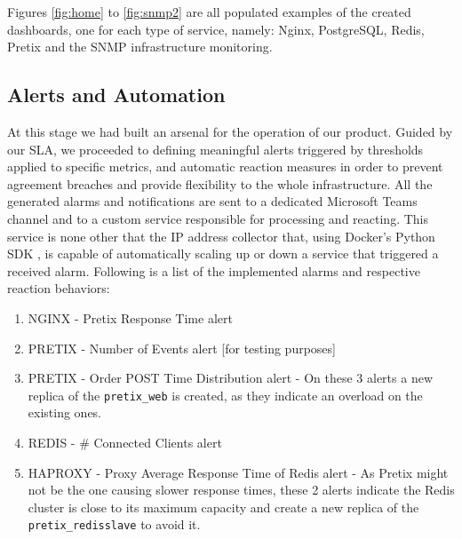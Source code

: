 \documentclass[12pt]{article}
\begin{document}
Figures \ref{fig:home} to \ref{fig:snmp2} are all populated examples of the created dashboards, one for each type of service, namely: 
Nginx, PostgreSQL, Redis, Pretix and the SNMP infrastructure monitoring.

\subsection{Alerts and Automation} \label{management.automation} %


At this stage we had built an arsenal for the operation of our product.
Guided by our SLA, we proceeded to defining meaningful alerts triggered by thresholds applied to specific metrics, and automatic reaction measures in order to
prevent agreement breaches and provide flexibility to the whole infrastructure.
All the generated alarms and notifications are sent to a dedicated Microsoft Teams channel and to a custom service responsible for processing and reacting.
This service is none other that the IP address collector that, using Docker's Python SDK \cite{dockerpythonsdk}, is capable of automatically scaling up or down
a service that triggered a received alarm.
Following is a list of the implemented alarms and respective reaction behaviors:

\vspace{-10pt}
\begin{enumerate}[noitemsep]
  \item NGINX   - Pretix Response Time alert
  \item PRETIX  - Number of Events alert [for testing purposes]
  \item PRETIX  - Order POST Time Distribution alert          - On these 3 alerts a new replica of the \texttt{pretix\_web} is created, as they indicate an overload on the existing ones.
  \item REDIS   - \# Connected Clients alert
  \item HAPROXY - Proxy Average Response Time of Redis alert  - As Pretix might not be the one causing slower response times, these 2 alerts indicate the Redis cluster is close to its maximum capacity and create a new replica of the \texttt{pretix\_redisslave} to avoid it.
\end{enumerate}
\vspace{-10pt}
\end{document}
